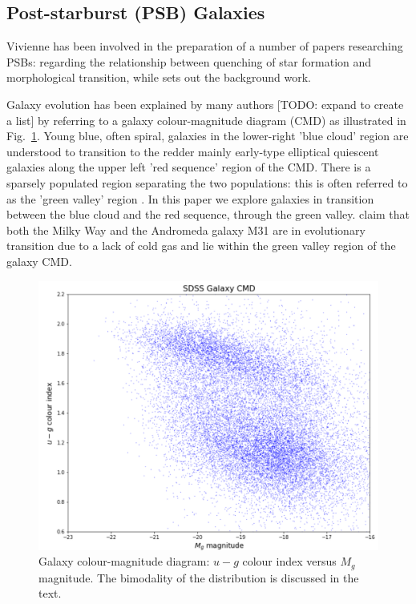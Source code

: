 \subsection{Post-starburst (PSB) Galaxies}
\label{sec:PSBs}
Vivienne has been involved in the preparation of a number of papers researching PSBs: \citet{2017MNRAS.472.1401A} regarding the relationship between quenching of star formation and morphological transition, while \citet{2016MNRAS.463..832W} sets out the background work.
\par Galaxy evolution has been explained by many authors [TODO: expand to create a list] \citep{baldry2004quantifying,2006MNRAS.373..469B} by referring to a galaxy colour-magnitude diagram (CMD) as illustrated in Fig.~\ref{fig:CMD1}. Young blue, often spiral, galaxies in the lower-right 'blue cloud' region are understood to transition to the redder mainly early-type elliptical quiescent galaxies along the upper left 'red sequence' region of the CMD. There is a sparsely populated region separating the two populations: this is often referred to as the 'green valley' region \citep{2004ApJ...608..752B}. In this paper we explore galaxies in transition between the blue cloud and the red sequence, through the green valley.
\citet{Mutch_2011} claim that both the Milky Way and the Andromeda galaxy M31 are in evolutionary transition due to a lack of cold gas and lie within the green valley region of the galaxy CMD.

\begin{figure}
	\includegraphics[width=\columnwidth]{images/CMDs/galaxyCMD.PNG}
    \caption{Galaxy colour-magnitude diagram: $u-g$ colour index versus $M_g$ magnitude. The bimodality of the distribution is discussed in the text.}
    \label{fig:CMD1}
\end{figure}